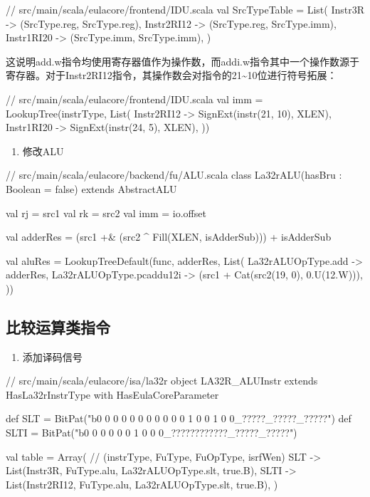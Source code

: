 \begin{CodeBlock}[language=BookScala]
// src/main/scala/eulacore/frontend/IDU.scala
val SrcTypeTable = List(
    Instr3R     -> (SrcType.reg, SrcType.reg),
    Instr2RI12  -> (SrcType.reg, SrcType.imm),
    Instr1RI20  -> (SrcType.imm, SrcType.imm),
  )
\end{CodeBlock}

这说明add.w指令均使用寄存器值作为操作数，而addi.w指令其中一个操作数源于寄存器。对于Instr2RI12指令，其操作数会对指令的21\textasciitilde10位进行符号拓展：

\begin{CodeBlock}[language=BookScala]
// src/main/scala/eulacore/frontend/IDU.scala
val imm = LookupTree(instrType, List(
    Instr2RI12    -> SignExt(instr(21, 10), XLEN),
    Instr1RI20    -> SignExt(instr(24, 5), XLEN),
  ))
\end{CodeBlock}

\begin{enumerate}
\def\labelenumi{\arabic{enumi}.}
\setcounter{enumi}{1}
\tightlist
\item
  修改ALU
\end{enumerate}

\begin{CodeBlock}[language=BookScala]
// src/main/scala/eulacore/backend/fu/ALU.scala
class La32rALU(hasBru : Boolean = false) extends AbstractALU {

  val rj = src1
  val rk = src2
  val imm = io.offset

  val adderRes = (src1 +& (src2 ^ Fill(XLEN, isAdderSub))) + isAdderSub

  val aluRes = LookupTreeDefault(func, adderRes, List(
    La32rALUOpType.add   -> adderRes,
    La32rALUOpType.pcaddu12i -> (src1 + Cat(src2(19, 0), 0.U(12.W))),
  ))
}
\end{CodeBlock}

\subsection{比较运算类指令}\label{sec:06-more-instructions-003}

\begin{enumerate}
\def\labelenumi{\arabic{enumi}.}
\tightlist
\item
  添加译码信号
\end{enumerate}

\begin{CodeBlock}[language=BookScala]
// src/main/scala/eulacore/isa/la32r
object LA32R_ALUInstr extends HasLa32rInstrType with HasEulaCoreParameter {
  def SLT     = BitPat("b0 0 0 0 0 0 0 0 0 0 0 1 0 0 1 0 0_?????_?????_?????")
  def SLTI    = BitPat("b0 0 0 0 0 0 1 0 0 0_????????????_?????_?????")

  val table = Array( // (instrType, FuType, FuOpType, isrfWen)
    SLT         -> List(Instr3R, FuType.alu, La32rALUOpType.slt, true.B),
    SLTI        -> List(Instr2RI12, FuType.alu, La32rALUOpType.slt, true.B),
  )
}
\end{CodeBlock}

